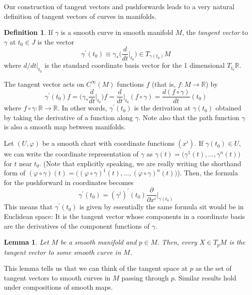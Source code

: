\documentclass{article}
\newtheorem{lemma}[theorem]{Lemma}
\theoremstyle{remark}
\theoremstyle{definition}
\newtheorem{definition}{Definition}[section]
\begin{document}
Our construction of tangent vectors and pushforwards leads to a very natural definition of tangent vectors of curves in manifolds. 

\begin{definition}
If $\gamma$ is a smooth curve in smooth manifold $M$, the \textit{tangent vector} to $\gamma$ at $t_0 \in J$ is the vector 
\[\gamma^\prime (t_0) \equiv \gamma_* \bigg( \frac{d}{dt} \bigg|_{t_0} \bigg) \in T_{\gamma(t_0)} M\]
where $d/dt \big|_{t_0}$ is the standard coordinate basis vector for the 1 dimensional $T_{t_0} \mathbb{R}$. 
\end{definition}

The tangent vector acts on $C^\infty(M)$ functions $f$ (that is, $f: M \longrightarrow \mathbb{R}$) by
\[\gamma^\prime (t_0) f = \bigg( \gamma_* \frac{d}{dt} \bigg|_{t_0} \bigg) f = \frac{d}{dt} \bigg|_{t_0} (f \circ \gamma) = \frac{d (f \circ \gamma)}{dt} (t_0)\]
where $f \circ \gamma: \mathbb{R} \longrightarrow \mathbb{R}$. In other words, $\gamma^\prime (t_0)$ is the derivation at $\gamma(t_0)$ obtained by taking the derivative of a function along $\gamma$. Note also that the path function $\gamma$ is also a smooth map between manifolds. 

Let $(U, \varphi)$ be a smooth chart with coordinate functions $(x^i)$. If $\gamma(t_0) \in U$, we can write the coordinate representation of $\gamma$ as $\gamma(t) = \big( \gamma^1 (t), ..., \gamma^n (t)\big)$ for $t$ near $t_0$. (Note that explicitly speaking, we are really writing the shorthand form of $(\varphi \circ \gamma) (t) = \big( (\varphi \circ \gamma)^1 (t), ..., (\varphi \circ \gamma)^n (t)\big)$). Then, the formula  for the pushforward in coordinates becomes 
\[\gamma^\prime (t_0) = (\gamma^i)^\prime (t_0) \frac{\partial}{\partial x^i} \bigg|_{\gamma(t_0)}\]
This means that $\gamma^\prime (t_0)$ is given by essentially the same formula sit would be in Euclidean space: It is the tangent vector whose components in a coordinate basis are the derivatives of the component functions of $\gamma$. 

\begin{lemma}
Let $M$ be a smooth manifold and $p \in M$. Then, every $X \in T_p M$ is the tangent vector to some smooth curve in $M$. 
\end{lemma}

This lemma tells us that we can think of the tangent space at $p$ as the set of tangent vectors to smooth curves in $M$ passing through $p$. Similar results hold under compositions of smooth maps. 
\end{document}
